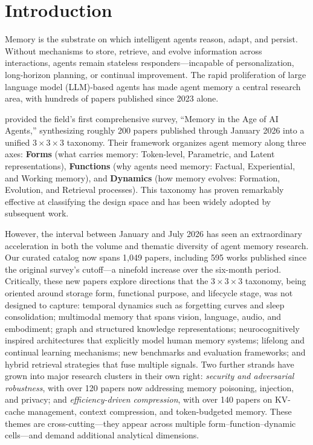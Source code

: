 \section{Introduction}
\label{sec:intro}

Memory is the substrate on which intelligent agents reason, adapt, and persist. Without mechanisms to store, retrieve, and evolve information across interactions, agents remain stateless responders---incapable of personalization, long-horizon planning, or continual improvement. The rapid proliferation of large language model (LLM)-based agents has made agent memory a central research area, with hundreds of papers published since 2023 alone.

\citet{DBLP:journals/corr/abs-2512-13564} provided the field's first comprehensive survey, ``Memory in the Age of AI Agents,'' synthesizing roughly 200 papers published through January 2026 into a unified $3\times 3 \times 3$ taxonomy. Their framework organizes agent memory along three axes: \textbf{Forms} (what carries memory: Token-level, Parametric, and Latent representations), \textbf{Functions} (why agents need memory: Factual, Experiential, and Working memory), and \textbf{Dynamics} (how memory evolves: Formation, Evolution, and Retrieval processes). This taxonomy has proven remarkably effective at classifying the design space and has been widely adopted by subsequent work.

However, the interval between January and July 2026 has seen an extraordinary acceleration in both the volume and thematic diversity of agent memory research. Our curated catalog now spans 1,049 papers, including 595 works published since the original survey's cutoff---a ninefold increase over the six-month period. Critically, these new papers explore directions that the $3\times 3 \times 3$ taxonomy, being oriented around storage form, functional purpose, and lifecycle stage, was not designed to capture: temporal dynamics such as forgetting curves and sleep consolidation; multimodal memory that spans vision, language, audio, and embodiment; graph and structured knowledge representations; neurocognitively inspired architectures that explicitly model human memory systems; lifelong and continual learning mechanisms; new benchmarks and evaluation frameworks; and hybrid retrieval strategies that fuse multiple signals. Two further strands have grown into major research clusters in their own right: \emph{security and adversarial robustness}, with over 120 papers now addressing memory poisoning, injection, and privacy; and \emph{efficiency-driven compression}, with over 140 papers on KV-cache management, context compression, and token-budgeted memory. These themes are cross-cutting---they appear across multiple form--function--dynamic cells---and demand additional analytical dimensions.

